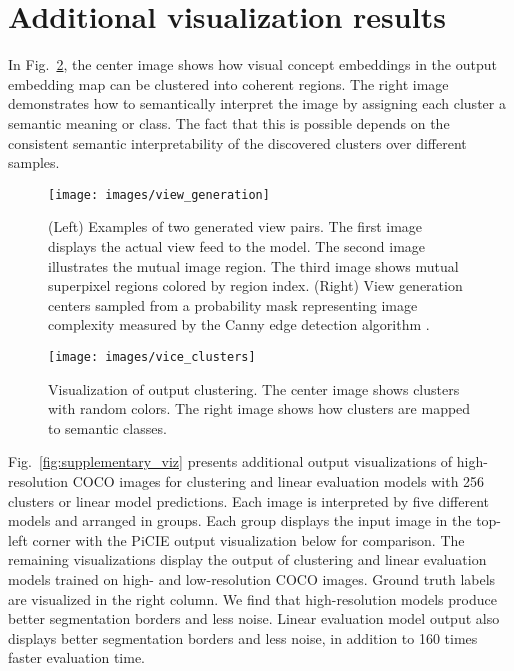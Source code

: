 \documentclass{bmvc2k}
\begin{document}
\section{Additional visualization results}

In Fig.~\ref{fig:cluster_viz}, the center image shows how visual concept embeddings in the output embedding map can be clustered into coherent regions. The right image demonstrates how to semantically interpret the image by assigning each cluster a semantic meaning or class. The fact that this is possible depends on the consistent semantic interpretability of the discovered clusters over different samples.

\begin{figure}
\begin{center}
\texttt{[image: images/view\_generation]}
\end{center}
   \caption{(Left) Examples of two generated view pairs. The first image displays the actual view feed to the model. The second image illustrates the mutual image region. The third image shows mutual superpixel regions colored by region index. (Right) View generation centers sampled from a probability mask representing image complexity measured by the Canny edge detection algorithm \cite{Canny1986CannyEdge}.}
\label{fig:view_generation}
\end{figure}

\begin{figure}
\begin{center}
\texttt{[image: images/vice\_clusters]}
\end{center}
   \caption{Visualization of output clustering. The center image shows clusters with random colors. The right image shows how clusters are mapped to semantic classes.}
\label{fig:cluster_viz}
\end{figure}

Fig.~\ref{fig:supplementary_viz} presents additional output visualizations of high-resolution COCO images for clustering and linear evaluation models with 256 clusters or linear model predictions. Each image is interpreted by five different models and arranged in groups. Each group displays the input image in the top-left corner with the PiCIE output visualization below for comparison. The remaining visualizations display the output of clustering and linear evaluation models trained on high- and low-resolution COCO images. Ground truth labels are visualized in the right column. We find that high-resolution models produce better segmentation borders and less noise. Linear evaluation model output also displays better segmentation borders and less noise, in addition to 160 times faster evaluation time.
\end{document}
